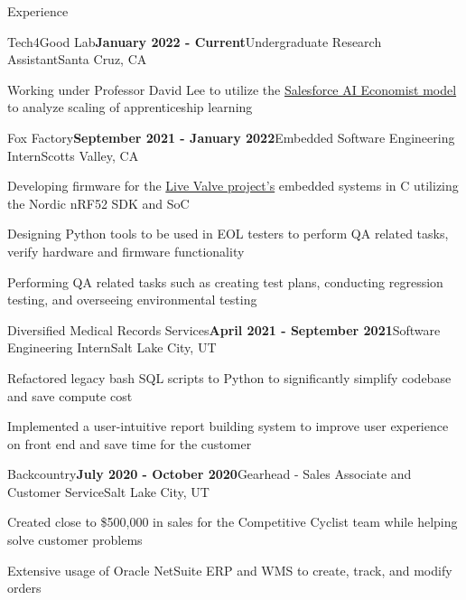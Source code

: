 \documentclass{resume}
\begin{document}
\begin{rSection}{\large Experience}


\begin{rSubsection}{Tech4Good Lab}{\bf{January 2022 - Current}}{Undergraduate Research Assistant}{Santa Cruz, CA }
\item Working under Professor David Lee to utilize the \href{https://github.com/salesforce/ai-economist}{Salesforce AI Economist model} to analyze scaling of apprenticeship learning
\end{rSubsection}

\begin{rSubsection}{Fox Factory}{\bf{September 2021 - January 2022}}{Embedded Software Engineering Intern}{Scotts Valley, CA }
\item Developing firmware for the \href{https://www.pinkbike.com/news/fox-updates-live-valve-electonic-suspension-for-2022.html}{Live Valve project's} embedded systems in C utilizing the Nordic nRF52 SDK and SoC
\item Designing Python tools to be used in EOL testers to perform QA related tasks, verify hardware and firmware functionality
\item Performing QA related tasks such as creating test plans, conducting regression testing, and overseeing environmental testing
\end{rSubsection}

\begin{rSubsection}{Diversified Medical Records Services}{\bf{April 2021 - September 2021}}{Software Engineering Intern}{Salt Lake City, UT }
\item Refactored legacy bash SQL scripts to Python to significantly simplify codebase and save compute cost
\item Implemented a user-intuitive report building system to improve user experience on front end and save time for the customer
\end{rSubsection}

\begin{rSubsection}{Backcountry}{\bf{July 2020 - October 2020}}{Gearhead - Sales Associate and Customer Service}{Salt Lake City, UT }
\item Created close to \$500,000 in sales for the Competitive Cyclist team while helping solve customer problems
\item Extensive usage of Oracle NetSuite ERP and WMS to create, track, and modify orders
\end{rSubsection}


\end{rSection}
\end{document}
